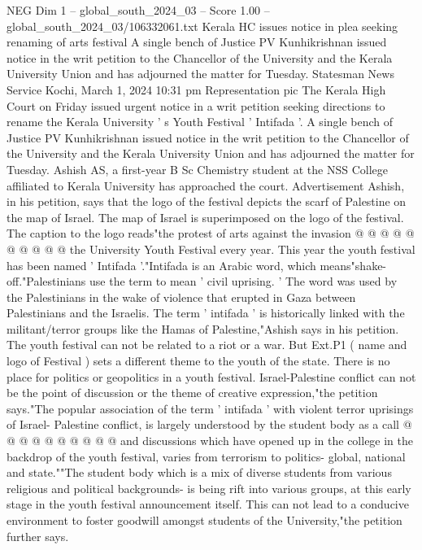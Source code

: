 \begin{textsample}{NEG Dim 1 – global\_south\_2024\_03 – Score 1.00 – global\_south\_2024\_03/106332061.txt}  \label{ex:f1_neg_436}
Kerala HC issues notice in plea seeking renaming of arts festival A single bench of Justice PV Kunhikrishnan issued notice in the writ petition to the Chancellor of the University and the Kerala University Union and has adjourned the matter for Tuesday.
Statesman News Service Kochi, March 1, 2024 10:31 pm Representation pic The Kerala High Court on Friday issued urgent notice in a writ petition seeking directions to rename the Kerala University ' s Youth Festival ' Intifada '.
A single bench of Justice PV Kunhikrishnan issued notice in the writ petition to the Chancellor of the University and the Kerala University Union and has adjourned the matter for Tuesday.
Ashish AS, a first-year B Sc Chemistry student at the NSS College affiliated to Kerala University has approached the court.
Advertisement Ashish, in his petition, says that the logo of the festival depicts the scarf of Palestine on the map of Israel.
The map of Israel is superimposed on the logo of the festival.
The caption to the logo reads"the protest of arts against the invasion @ @ @ @ @ @ @ @ @ @ the University Youth Festival every year.
This year the youth festival has been named ' Intifada '."Intifada is an Arabic word, which means"shake-off."Palestinians use the term to mean ' civil uprising. ' The word was used by the Palestinians in the wake of violence that erupted in Gaza between Palestinians and the Israelis.
The term ' intifada ' is historically linked with the militant/terror groups like the Hamas of Palestine,"Ashish says in his petition.
The youth festival can not be related to a riot or a war.
But Ext.P1 ( name and logo of Festival ) sets a different theme to the youth of the state.
There is no place for politics or geopolitics in a youth festival.
Israel-Palestine conflict can not be the point of discussion or the theme of creative expression,"the petition says."The popular association of the term ' intifada ' with violent terror uprisings of Israel- Palestine conflict, is largely understood by the student body as a call @ @ @ @ @ @ @ @ @ @ and discussions which have opened up in the college in the backdrop of the youth festival, varies from terrorism to politics- global, national and state.""The student body which is a mix of diverse students from various religious and political backgrounds- is being rift into various groups, at this early stage in the youth festival announcement itself.
This can not lead to a conducive environment to foster goodwill amongst students of the University,"the petition further says.

\end{textsample}

